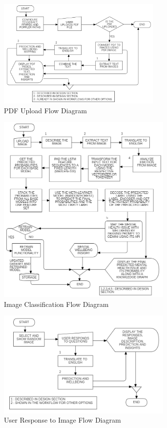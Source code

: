 \begin{figure}[H]  
    \centering
    \includegraphics[width=0.72\textwidth]{Images/APP PDF.png}  
    \caption*{PDF Upload Flow Diagram}
    \label{01234i}  %
\end{figure}

\pagebreak

\begin{figure}[H]  
    \centering
    \includegraphics[width=0.77\textwidth]{Images/APP IMAGE OPTION.png}  
    \caption*{Image Classification Flow Diagram}
    \label{011232i}  %
\end{figure}

\begin{figure}[H]  
    \centering
    \includegraphics[width=0.77\textwidth]{Images/APP RESPOND.png}  
    \caption*{User Response to Image Flow Diagram}
    \label{01234i}  %
\end{figure}

